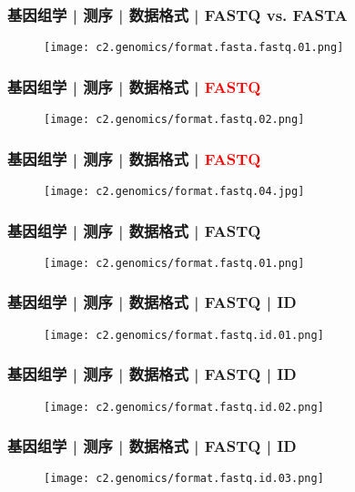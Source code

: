 \begin{frame}
  \frametitle{基因组学 | 测序 | 数据格式 | FASTQ vs. FASTA}
  \begin{figure}
    \centering
    \texttt{[image: c2.genomics/format.fasta.fastq.01.png]}
  \end{figure}
\end{frame}

\begin{frame}
  \frametitle{基因组学 | 测序 | 数据格式 | \textcolor{red}{FASTQ}}
  \begin{figure}
    \centering
    \texttt{[image: c2.genomics/format.fastq.02.png]}
  \end{figure}
\end{frame}
    
\begin{frame}
  \frametitle{基因组学 | 测序 | 数据格式 | \textcolor{red}{FASTQ}}
  \begin{figure}
    \centering
    \texttt{[image: c2.genomics/format.fastq.04.jpg]}
  \end{figure}
\end{frame}
    
\begin{frame}
  \frametitle{基因组学 | 测序 | 数据格式 | FASTQ}
  \begin{figure}
    \centering
    \texttt{[image: c2.genomics/format.fastq.01.png]}
  \end{figure}
\end{frame}
    
\begin{frame}
  \frametitle{基因组学 | 测序 | 数据格式 | FASTQ | ID}
  \begin{figure}
    \centering
    \texttt{[image: c2.genomics/format.fastq.id.01.png]}
  \end{figure}
\end{frame}
    
\begin{frame}
  \frametitle{基因组学 | 测序 | 数据格式 | FASTQ | ID}
  \begin{figure}
    \centering
    \texttt{[image: c2.genomics/format.fastq.id.02.png]}
  \end{figure}
\end{frame}
    
\begin{frame}
  \frametitle{基因组学 | 测序 | 数据格式 | FASTQ | ID}
  \begin{figure}
    \centering
    \texttt{[image: c2.genomics/format.fastq.id.03.png]}
  \end{figure}
\end{frame}
    
